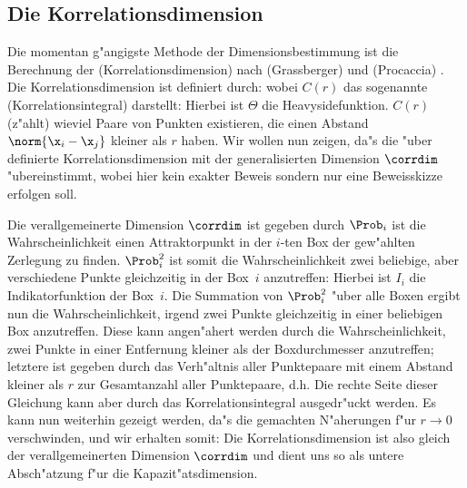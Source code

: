 
\subsection{Die Korrelationsdimension}
\label{chapcorrdim}

Die momentan g"angigste Methode der Dimensionsbestimmung ist die Berechnung der
\begriff(Korrelationsdimension) nach \autor(Grassberger) und \autor(Procaccia)
\cite{Grassberger-procaccia}. Die Korrelationsdimension ist definiert durch:
wobei $C(r)$ das sogenannte \begriff(Korrelationsintegral) darstellt: 
Hierbei ist $\Theta$ die Heavysidefunktion. 
$C(r)$ \naja(z"ahlt) wieviel Paare von Punkten existieren, die einen Abstand
$\norm{\x_i-\x_j}$ kleiner als $r$ haben. Wir wollen nun zeigen, da"s die "uber
 definierte Korrelationsdimension mit der generalisierten Dimension $\corrdim$ 
"ubereinstimmt, wobei hier kein exakter Beweis sondern nur eine Beweisskizze erfolgen
soll.


Die verallgemeinerte Dimension $\corrdim$ ist gegeben durch
$\Prob_i$ ist die Wahrscheinlichkeit einen Attraktorpunkt in der $i$-ten Box der
gew"ahlten Zerlegung zu finden. $\Prob_i^2$ ist somit die Wahrscheinlichkeit zwei
beliebige, aber verschiedene Punkte gleichzeitig in der Box~$i$ anzutreffen:
Hierbei ist $I_i$ die Indikatorfunktion der Box~$i$.  Die Summation von $\Prob_i^2$ "uber
alle Boxen ergibt nun die Wahrscheinlichkeit, irgend zwei Punkte gleichzeitig in einer
beliebigen Box anzutreffen.  Diese kann angen"ahert werden durch die Wahrscheinlichkeit,
zwei Punkte in einer Entfernung kleiner als der Boxdurchmesser anzutreffen;
letztere ist gegeben durch das Verh"altnis aller Punktepaare mit einem
Abstand kleiner als $r$ zur Gesamtanzahl aller Punktepaare, d.h.
Die rechte Seite dieser Gleichung kann aber durch das Korrelationsintegral
 ausgedr"uckt werden. Es kann nun weiterhin gezeigt werden, da"s die
gemachten N"aherungen f"ur $r\to0$ verschwinden, und wir erhalten somit:
Die Korrelationsdimension ist also gleich der verallgemeinerten Dimension $\corrdim$ und dient
uns so als untere Absch"atzung f"ur die  Kapazit"atsdimension. 

